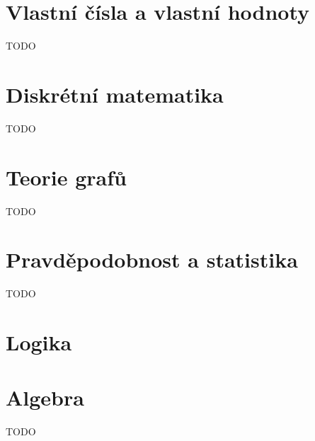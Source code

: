 \section{Vlastní čísla a vlastní hodnoty}
TODO

\section{Diskrétní matematika}
TODO

\section{Teorie grafů}
TODO

\section{Pravděpodobnost a statistika}
TODO

\section{Logika}


\section{Algebra}
TODO

